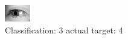 \begin{figure}[h!]
\begin{center}
\includegraphics[width=0.60\columnwidth]{figures/ID3213_class_3_target_4.png}
\end{center}
\caption{ Classification: 3 actual target: 4}
\label{fig:ID3213_class_3_target_4}
\end{figure}
